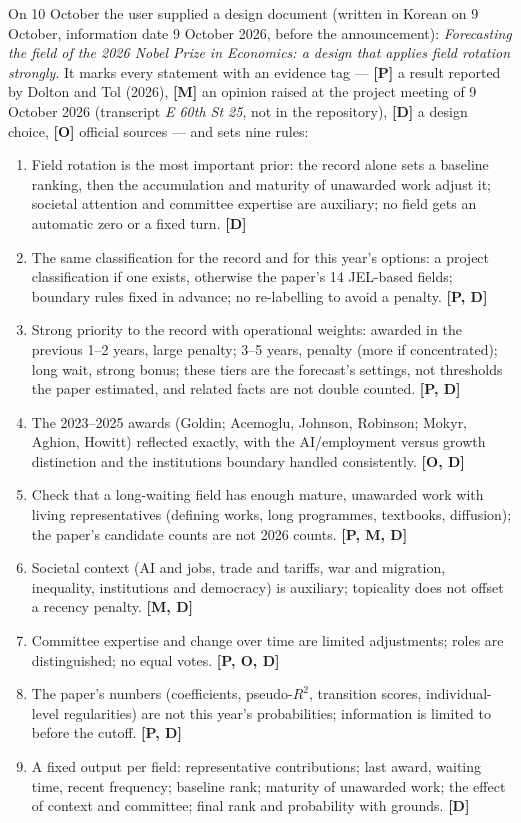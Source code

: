 \documentclass[11pt,a4paper]{article}
\newcommand{\evtag}[1]{\textbf{[#1]}}
\begin{document}
On 10 October the user supplied a design document (written in Korean on 9 October, information date 9 October 2026,
before the announcement): \emph{Forecasting the field of the 2026 Nobel Prize in Economics: a design that applies
field rotation strongly}. It marks every statement with an evidence tag --- \evtag{P} a result reported by Dolton and
Tol (2026), \evtag{M} an opinion raised at the project meeting of 9 October 2026 (transcript \emph{E 60th St 25}, not
in the repository), \evtag{D} a design choice, \evtag{O} official sources --- and sets nine rules:

\begin{enumerate}
\item Field rotation is the most important prior: the record alone sets a baseline ranking, then the accumulation and
  maturity of unawarded work adjust it; societal attention and committee expertise are auxiliary; no field gets an
  automatic zero or a fixed turn. \evtag{D}
\item The same classification for the record and for this year's options: a project classification if one exists,
  otherwise the paper's 14 JEL-based fields; boundary rules fixed in advance; no re-labelling to avoid a penalty.
  \evtag{P, D}
\item Strong priority to the record with operational weights: awarded in the previous 1--2 years, large penalty;
  3--5 years, penalty (more if concentrated); long wait, strong bonus; these tiers are the forecast's settings, not
  thresholds the paper estimated, and related facts are not double counted. \evtag{P, D}
\item The 2023--2025 awards (Goldin; Acemoglu, Johnson, Robinson; Mokyr, Aghion, Howitt) reflected exactly, with the
  AI/employment versus growth distinction and the institutions boundary handled consistently. \evtag{O, D}
\item Check that a long-waiting field has enough mature, unawarded work with living representatives (defining
  works, long programmes, textbooks, diffusion); the paper's candidate counts are not 2026 counts. \evtag{P, M, D}
\item Societal context (AI and jobs, trade and tariffs, war and migration, inequality, institutions and democracy)
  is auxiliary; topicality does not offset a recency penalty. \evtag{M, D}
\item Committee expertise and change over time are limited adjustments; roles are distinguished; no equal votes.
  \evtag{P, O, D}
\item The paper's numbers (coefficients, pseudo-$R^2$, transition scores, individual-level regularities) are not
  this year's probabilities; information is limited to before the cutoff. \evtag{P, D}
\item A fixed output per field: representative contributions; last award, waiting time, recent frequency; baseline
  rank; maturity of unawarded work; the effect of context and committee; final rank and probability with grounds.
  \evtag{D}
\end{enumerate}
\end{document}
